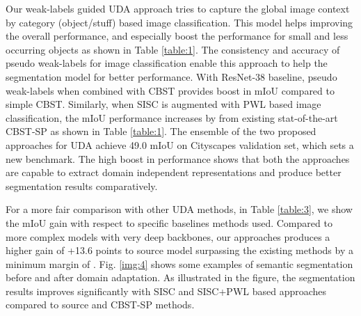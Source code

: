 \documentclass[10pt,twocolumn,letterpaper]{article}
\begin{document}
Our weak-labels guided UDA approach tries to capture the global image context by category (object/stuff) based image classification. This model helps improving the overall performance, and especially boost the performance for small and less occurring objects as shown in Table \ref{table:1}. The consistency and accuracy of pseudo weak-labels for image classification enable this approach to help the segmentation model for better performance. With ResNet-38 baseline, pseudo weak-labels when combined with CBST \cite{zou2018unsupervised} provides  boost in mIoU compared to simple CBST. Similarly, when SISC is augmented with PWL based image classification, the mIoU performance increases by  from existing stat-of-the-art CBST-SP \cite{zou2018unsupervised} as shown in Table \ref{table:1}. The ensemble of the two proposed approaches for UDA achieve 49.0 mIoU on Cityscapes validation set, which sets a new benchmark. The high boost in performance shows that both the approaches are capable to extract domain independent representations and produce better segmentation results comparatively. 


For a more fair comparison with other UDA methods, in Table \ref{table:3}, we show the mIoU gain with respect to specific baselines methods used. Compared to more complex models with very deep backbones, our approaches produces a higher gain of +13.6 points to source model surpassing the existing methods by a minimum margin of .
Fig. \ref{img:4} shows some examples of semantic segmentation before and after domain adaptation. As illustrated in the figure, the segmentation results improves significantly with SISC and SISC+PWL based approaches compared to source and CBST-SP methods.  
\end{document}
